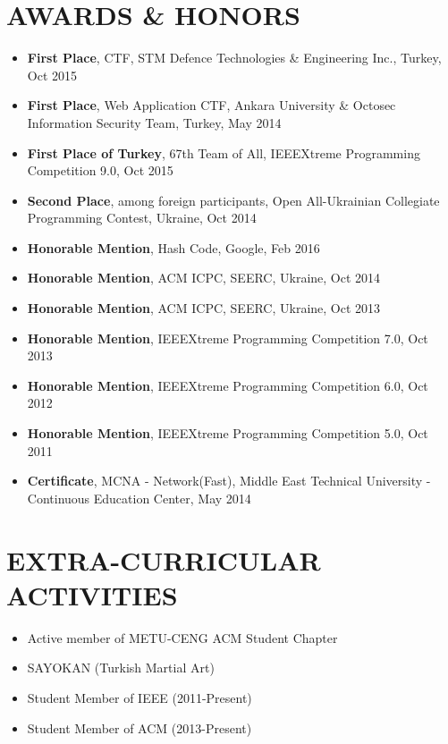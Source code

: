 \documentclass[margin, 10pt]{res} %
\begin{document}
\begin{resume}
\section{AWARDS \& HONORS}
\begin{itemize} \itemsep -2pt %
\item {\bf First Place}, CTF, STM Defence Technologies \& Engineering Inc., Turkey, Oct 2015
\item {\bf First Place}, Web Application CTF, Ankara University \& Octosec Information Security Team, Turkey, May 2014
\item {\bf First Place of Turkey}, 67th Team of All, IEEEXtreme Programming Competition 9.0, Oct 2015
\item {\bf Second Place}, among foreign participants, Open All-Ukrainian Collegiate Programming Contest, Ukraine, Oct 2014
\item {\bf Honorable Mention}, Hash Code, Google, Feb 2016
\item {\bf Honorable Mention}, ACM ICPC, SEERC, Ukraine, Oct 2014
\item {\bf Honorable Mention}, ACM ICPC, SEERC, Ukraine, Oct 2013
\item {\bf Honorable Mention}, IEEEXtreme Programming Competition 7.0, Oct 2013
\item {\bf Honorable Mention}, IEEEXtreme Programming Competition 6.0, Oct 2012
\item {\bf Honorable Mention}, IEEEXtreme Programming Competition 5.0, Oct 2011
\item {\bf Certificate}, MCNA - Network(Fast), Middle East Technical University - Continuous Education Center, May 2014
\end{itemize}



\section{EXTRA-CURRICULAR \\ ACTIVITIES}

\begin{itemize} \itemsep -2pt %
\item Active member of METU-CENG ACM Student Chapter
\item SAYOKAN (Turkish Martial Art)
\item Student Member of IEEE (2011-Present)
\item Student Member of ACM (2013-Present)
\end{itemize}







\end{resume}
\end{document}
